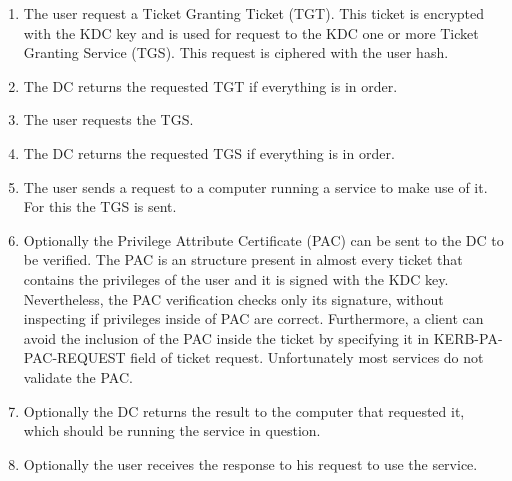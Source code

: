 \begin{enumerate}
	\item The user request a Ticket Granting Ticket (TGT). This ticket is encrypted with the KDC key and is used for request to the KDC one or more Ticket Granting Service (TGS). This request is ciphered with the user hash.
	\item The DC returns the requested TGT if everything is in order.
	\item The user requests the TGS.
	\item The DC returns the requested TGS if everything is in order.
	\item The user sends a request to a computer running a service to make use of it. For this the TGS is sent.
	\item Optionally the Privilege Attribute Certificate (PAC) can be sent to the DC to be verified. The PAC is an structure present in almost every ticket that contains the privileges of the user and it is signed with the KDC key. Nevertheless, the PAC verification checks only its signature, without inspecting if privileges inside of PAC are correct. Furthermore, a client can avoid the inclusion of the PAC inside the ticket by specifying it in KERB-PA-PAC-REQUEST field of ticket request. Unfortunately most services do not validate the PAC.
	\item Optionally the DC returns the result to the computer that requested it, which should be running the service in question.
	\item Optionally the user receives the response to his request to use the service.
\end{enumerate}

